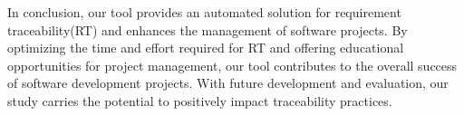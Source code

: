 \documentclass[conference]{IEEEtran}
\begin{document}
In conclusion, our tool provides an automated solution for requirement traceability(RT) and enhances the management of software projects. By optimizing the time and effort required for RT and offering educational opportunities for project management, our tool contributes to the overall success of software development projects. With future development and evaluation, our study carries the potential to positively impact traceability practices.







\end{document}
